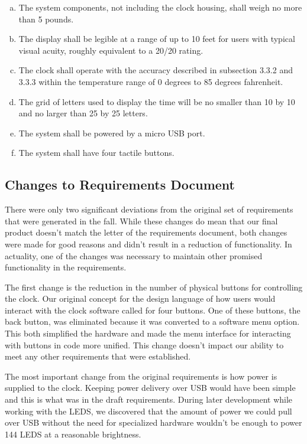 \documentclass[onecolumn, draftclsnofoot,10pt, compsoc]{IEEEtran}
\begin{document}
\begin{enumerate}[a)]
  \item The system components, not including the clock housing, shall weigh no
  more than 5 pounds.
  \item The display shall be legible at a range of up to 10 feet for users with
  typical visual acuity, roughly equivalent to a 20/20 rating.
  \item The clock shall operate with the accuracy described in subsection 3.3.2 and
  3.3.3 within the temperature range of 0 degrees to 85 degrees fahrenheit.
  \item The grid of letters used to display the time will be no smaller than 10
  by 10 and no larger than 25 by 25 letters.
  \item The system shall be powered by a micro USB port.
  \item The system shall have four tactile buttons.
\end{enumerate}

\subsection{Changes to Requirements Document}
There were only two significant deviations from the original set of requirements that were generated in the fall. While these changes do mean that our final product doesn’t match the letter of the requirements document, both changes were made for good reasons and didn’t result in a reduction of functionality. In actuality, one of the changes was necessary to maintain other promised functionality in the requirements.

The first change is the reduction in the number of physical buttons for controlling the clock. Our original concept for the design language of how users would interact with the clock software called for four buttons. One of these buttons, the back button, was eliminated because it was converted to a software menu option. This both simplified the hardware and made the menu interface for interacting with buttons in code more unified. This change doesn’t impact our ability to meet any other requirements that were established.

The most important change from the original requirements is how power is supplied to the clock. Keeping power delivery over USB would have been simple and this is what was in the draft requirements. During later development while working with the LEDS, we discovered that the amount of power we could pull over USB without the need for specialized hardware wouldn’t be enough to power 144 LEDS at a reasonable brightness.
\end{document}
